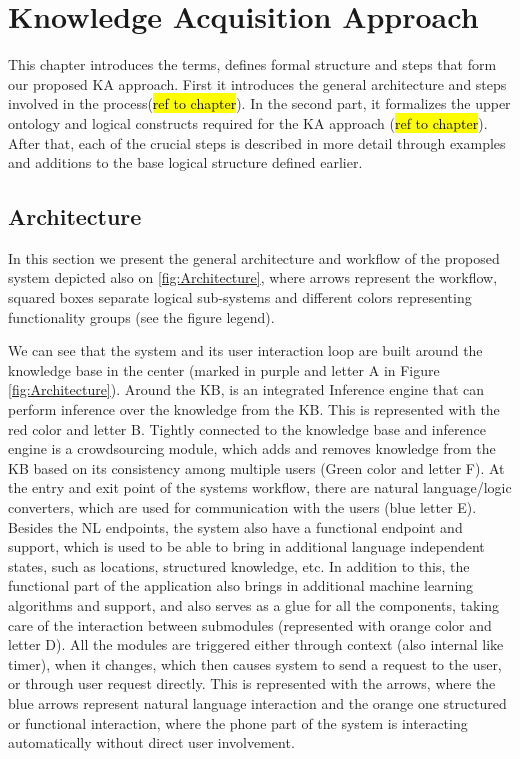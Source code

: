 % 
\chapter{Knowledge Acquisition Approach}

This chapter introduces the terms, defines formal structure and steps that form our proposed KA approach. First it introduces the general architecture and steps involved in the process(\hl{ref to chapter}). In the second part, it formalizes the upper ontology and logical constructs required for the KA approach (\hl{ref to chapter}). After that, each of the crucial steps is described in more detail through examples and additions to the base logical structure defined earlier.

\section{Architecture}

In this section we present the general architecture and workflow of the proposed system depicted also on \ref{fig:Architecture}, where arrows represent the workflow, squared boxes separate logical sub-systems and different colors representing functionality groups (see the figure legend).

We can see that the system and its user interaction loop are built around the knowledge base in the center (marked in purple and letter A in Figure \ref{fig:Architecture}). Around the KB, is an integrated Inference engine that can perform inference over the knowledge from the KB. This is represented with the red color and letter B. Tightly connected to the knowledge base and inference engine is a crowdsourcing module, which adds and removes knowledge from the KB based on its consistency among multiple users (Green color and letter F). At the entry and exit point of the systems workflow, there are natural language/logic converters, which are used for communication with the users (blue letter E). Besides the NL endpoints, the system also have a functional endpoint and support, which is used to be able to bring in additional language independent states, such as locations, structured knowledge, etc. In addition to this, the functional part of the application also brings in additional machine learning algorithms and support, and also serves as a glue for all the components, taking care of the interaction between submodules (represented with orange color and letter D). All the modules are triggered either through context (also internal like timer), when it changes, which then causes system to send a request to the user, or through user request directly. This is represented with the arrows, where the blue arrows represent natural language interaction and the orange one structured or functional interaction, where the phone part of the system is interacting automatically without direct user involvement.

